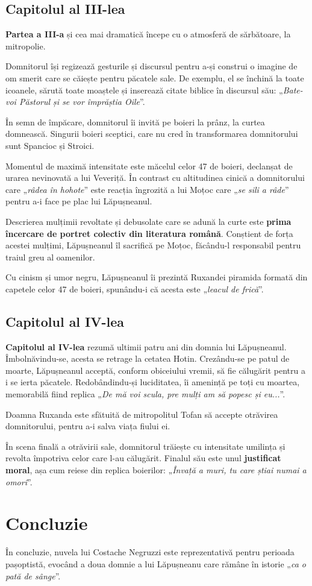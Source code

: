 \documentclass{article}
\newcommand{\qu}[1]{„\emph{#1}”}
\begin{document}
\subsection{Capitolul al III-lea}
\textbf{Partea a III-a} și cea mai dramatică începe cu o atmosferă de sărbătoare, la mitropolie.

Domnitorul își regizează gesturile și discursul pentru a-și construi o imagine de om smerit care se căiește pentru păcatele sale. De exemplu, el se închină la toate icoanele, sărută toate moaștele și inserează citate biblice în discursul său: \qu{Bate-voi Păstorul și se vor împrăștia Oile}.

În semn de împăcare, domnitorul îi invită pe boieri la prânz, la curtea domnească. Singurii boieri sceptici, care nu cred în transformarea domnitorului sunt Spancioc și Stroici.

Momentul de maximă intensitate este măcelul celor 47 de boieri, declanșat de urarea nevinovată a lui Veveriță. În contrast cu altitudinea cinică a domnitorului care \qu{râdea în hohote} este reacția îngrozită a lui Moțoc care \qu{se sili a râde} pentru a-i face pe plac lui Lăpușneanul.

Descrierea mulțimii revoltate și debusolate care se adună la curte este \textbf{prima încercare de portret colectiv din literatura română}. Conștient de forța acestei mulțimi, Lăpușneanul îl sacrifică pe Moțoc, făcându-l responsabil pentru traiul greu al oamenilor.

Cu cinism și umor negru, Lăpușneanul îi prezintă Ruxandei piramida formată din capetele celor 47 de boieri, spunându-i că acesta este \qu{leacul de frică}.
\subsection{Capitolul al IV-lea}
\textbf{Capitolul al IV-lea} rezumă ultimii patru ani din domnia lui Lăpușneanul. Îmbolnăvindu-se, acesta se retrage la cetatea Hotin. Crezându-se pe patul de moarte, Lăpușneanul acceptă, conform obiceiului vremii, să fie călugărit pentru a i se ierta păcatele. Redobândindu-și luciditatea, îi amenință pe toți cu moartea, memorabilă fiind replica \qu{De mă voi scula, pre mulți am să popesc și eu...}.

Doamna Ruxanda este sfătuită de mitropolitul Tofan să accepte otrăvirea domnitorului, pentru a-i salva viața fiului ei.

În scena finală a otrăvirii sale, domnitorul trăiește cu intensitate umilința și revolta împotriva celor care l-au călugărit. Finalul său este unul \textbf{justificat moral}, așa cum reiese din replica boierilor: \qu{Învață a muri, tu care știai numai a omorî}.
\section{Concluzie}
În concluzie, nuvela lui Costache Negruzzi este reprezentativă pentru perioada pașoptistă, evocând a doua domnie a lui Lăpușneanu care rămâne în istorie \qu{ca o pată de sânge}.
\end{document}
